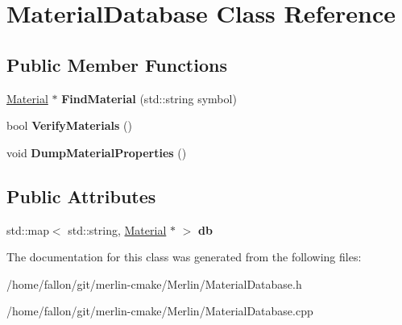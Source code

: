 \hypertarget{classMaterialDatabase}{}\section{Material\+Database Class Reference}
\label{classMaterialDatabase}
\subsection*{Public Member Functions}
\begin{DoxyCompactItemize}
\item 
\mbox{\label{classMaterialDatabase_a68b0a76231c3229040aba4b97dae4a6b}} 
\hyperlink{classMaterial}{Material} $\ast$ {\bfseries Find\+Material} (std\+::string symbol)
\item 
\mbox{\label{classMaterialDatabase_a7e759c5841af04bde79283377b0655c1}} 
bool {\bfseries Verify\+Materials} ()
\item 
\mbox{\label{classMaterialDatabase_adb84e0a24c7f2f70d4ee8c9604212236}} 
void {\bfseries Dump\+Material\+Properties} ()
\end{DoxyCompactItemize}
\subsection*{Public Attributes}
\begin{DoxyCompactItemize}
\item 
\mbox{\label{classMaterialDatabase_a11749a3b302062c998d983929681629f}} 
std\+::map$<$ std\+::string, \hyperlink{classMaterial}{Material} $\ast$ $>$ {\bfseries db}
\end{DoxyCompactItemize}


The documentation for this class was generated from the following files\+:\begin{DoxyCompactItemize}
\item 
/home/fallon/git/merlin-\/cmake/\+Merlin/Material\+Database.\+h\item 
/home/fallon/git/merlin-\/cmake/\+Merlin/Material\+Database.\+cpp\end{DoxyCompactItemize}
